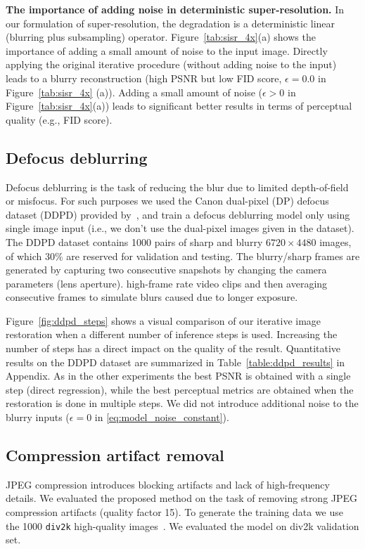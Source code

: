 \documentclass[10pt]{article} %
\begin{document}
\textbf{The importance of adding noise in deterministic super-resolution.} In our formulation of super-resolution, the degradation is a deterministic linear (blurring plus subsampling) operator. Figure~\ref{tab:sisr_4x}(a) shows the importance of adding a small amount of noise to the input image. Directly applying the original iterative procedure (without adding noise to the input) leads to a blurry reconstruction (high PSNR but low FID score, $\epsilon=0.0$ in Figure~\ref{tab:sisr_4x} (a)). Adding a small amount of noise  ($\epsilon > 0$ in Figure~\ref{tab:sisr_4x}(a)) leads to significant better results in terms of perceptual quality (e.g., FID score).










\subsection{Defocus deblurring}
Defocus deblurring is the task of reducing the blur due to limited depth-of-field or misfocus. For such purposes we used the Canon dual-pixel (DP) defocus dataset (DDPD) provided by~\citet{abuolaim2020defocus}, and train a defocus deblurring model only using single image input (i.e., we don't use the dual-pixel images given in the dataset). 
The DDPD dataset contains 1000 pairs of sharp and blurry $6720 \times 4480$ images, of which 30\% are reserved for validation and testing. The blurry/sharp frames are generated by capturing two consecutive snapshots by changing the camera parameters (lens aperture). high-frame rate video clips and then averaging consecutive frames to simulate blurs caused due to longer exposure.



Figure~\ref{fig:ddpd_steps} shows a visual comparison of our iterative image restoration when a different number of inference steps is used.  Increasing the number of steps has a direct impact on the quality of the result. Quantitative results on the DDPD dataset are summarized in Table~\ref{table:ddpd_results} in Appendix. As in the other experiments the best PSNR is obtained with a single step (direct regression), while the best perceptual metrics are obtained when the restoration is done in multiple steps.  We did not introduce additional noise to the blurry inputs ($\epsilon =0$ in \eqref{eq:model_noise_constant}).

\subsection{Compression artifact removal}
JPEG compression introduces blocking artifacts and lack of high-frequency details. We evaluated the proposed method on the task of removing strong JPEG compression artifacts (quality factor 15). To generate the training data we use the 1000 \texttt{div2k} high-quality images~\citep{div2k}. We evaluated the model on div2k validation set.
\end{document}
